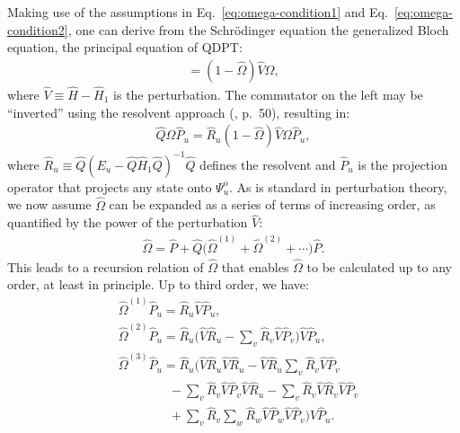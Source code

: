 Making use of the assumptions in Eq.\ \eqref{eq:omega-condition1} and Eq.\ \eqref{eq:omega-condition2}, one can derive from the Schr\"odinger equation the generalized Bloch equation, the principal equation of QDPT:
\begin{gather*}
  [\hat \Omega, \hat{H}_1] =
  (1 - \hat \Omega) \hat V \Omega,
\end{gather*}
where $\hat V \equiv \hat H - \hat{H}_1$ is the perturbation.  The commutator on the left may be ``inverted'' using the resolvent approach (\cite{shavitt2009many}, p.\ 50), resulting in:
\begin{align*}
  \hat Q \Omega \hat P_u =
  \hat R_u (1 - \hat \Omega) \hat V \Omega \hat P_u,
\end{align*}
where $\hat R_u \equiv \hat Q (E_u - \hat Q \hat{H}_1 \hat Q)^{-1} \hat Q$ defines the resolvent and $\hat P_u$ is the projection operator that projects any state onto $\Psi^{\mathrm{o}}_u$.  As is standard in perturbation theory, we now assume $\hat \Omega$ can be expanded as a series of terms of increasing order, as quantified by the power of the perturbation $\hat V$:
\begin{align*}
  \hat \Omega = \hat P +
  \hat Q\bigl(\hat \Omega^{(1)} + \hat \Omega^{(2)} + \cdots\bigr) \hat P.
\end{align*}
This leads to a recursion relation of $\hat \Omega$ that enables $\hat \Omega$ to be calculated up to any order, at least in principle.  Up to third order, we have:
\begin{align*}
  &\hat \Omega^{(1)} \hat P_u = \hat R_u \hat V \hat P_u, \\
  &\hat \Omega^{(2)} \hat P_u =
    \hat R_u \biggl(
    \hat V \hat R_u
    - \sum_v \hat R_v \hat V \hat P_v
    \biggr) \hat V \hat P_u, \\
  &\hat \Omega^{(3)} \hat P_u =
    \hat R_u \biggl(
    \hat V \hat R_u \hat V \hat R_u
    - \hat V \hat R_u \sum_v \hat R_v \hat V \hat P_v \\
  &\qquad\qquad
    - \sum_v \hat R_v \hat V \hat P_v \hat V \hat R_u
    - \sum_v \hat R_v \hat V \hat R_v \hat V \hat P_v \\
  &\qquad\qquad
    + \sum_v \hat R_v \sum_w \hat R_w \hat V \hat P_w \hat V \hat P_v
    \biggr) \hat V \hat P_u.
\end{align*}

